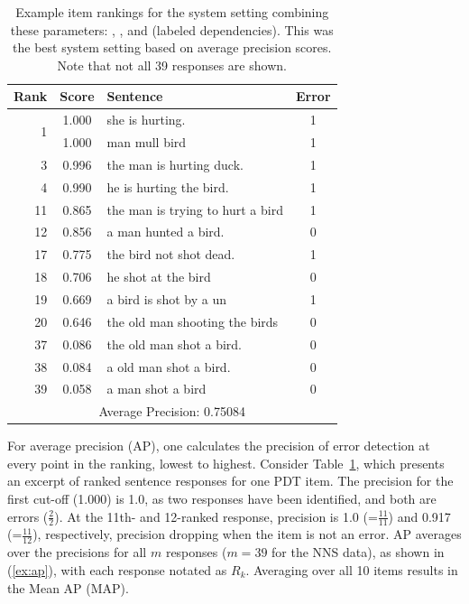 \begin{table}[htb!]
\begin{center}
\setlength{\tabcolsep}{0.3em}
\begin{tabular}{|r|c|l|c|}
\hline
Rank & Score & Sentence & Error \\
\hline
\hline
\multirow{2}{*}{1} & 1.000 & she is hurting. & 1 \\
& 1.000 & man mull bird & 1 \\
\hline
3 & 0.996 & the man is hurting duck. & 1 \\
4 & 0.990 & he is hurting the bird. & 1 \\
\hline
11 & 0.865 & the man is trying to hurt a bird & 1 \\
12 & 0.856 & a man hunted a bird. & 0 \\
\hline
17 & 0.775 & the bird not shot dead.  & 1 \\
18 & 0.706 & he shot at the bird & 0 \\
19 & 0.669 & a bird is shot by a un & 1 \\
20 & 0.646 & the old man shooting the birds & 0 \\
\hline
37 & 0.086 & the old man shot a bird. & 0 \\
38 & 0.084 & a old man shot a bird. & 0 \\
39 & 0.058 & a man shot a bird & 0 \\
\hline
\hline
\multicolumn{4}{|c|}{Average Precision: 0.75084} \\
\hline
\end{tabular}
\caption{Example item rankings for the system setting combining these parameters: , , and  (labeled dependencies). This was the best system setting based on average precision scores. Note that not all 39 responses are shown.}
\label{tab:i10responses-avgprec}
\end{center}
\end{table}

For average precision (AP), one calculates the precision of error
detection at every point in the ranking, lowest to highest. Consider
Table~\ref{tab:i10responses-avgprec}, which presents an excerpt of ranked sentence
responses for one PDT item. The precision for
the first cut-off (1.000) is 1.0, as two responses have been
identified, and both are errors ($\frac{2}{2}$). At the 11th- and
12-ranked response, precision is 1.0 (=$\frac{11}{11}$) and 0.917
(=$\frac{11}{12}$), respectively, precision dropping when the item is
not an error.
AP averages over the precisions for all $m$ responses ($m=39$ for the
NNS data), as shown in (\ref{ex:ap}), with each response notated as
$R_k$.  Averaging over all 10 items results in the Mean AP (MAP).

